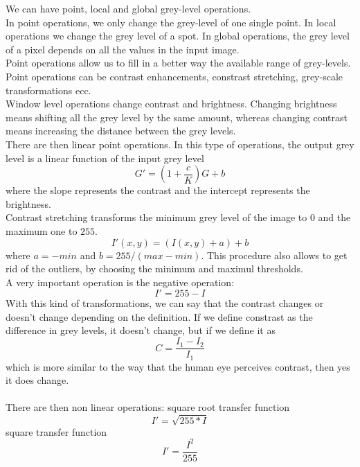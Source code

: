 We can have point, local and global grey-level operations. \\
In point operations, we only change the grey-level of one single point. In local operations we change the grey level of a spot. In global operations, the grey level of a pixel depends on all the values in the input image. \\
Point operations allow us to fill in a better way the available range of grey-levels. \\
Point operations can be contrast enhancements, constrast stretching, grey-scale transformations ecc. \\
Window level operations change contrast and brightness. Changing brightness means shifting all the grey level by the same amount, whereas changing contrast means increasing the distance between the grey levels. \\
There are then linear point operations. In this type of operations, the output grey level is a linear function of the input grey level
$$
	G' = \left(1+\frac{c}{K}\right)G + b
$$
where the slope represents the contrast and the intercept represents the brightness. \\
Contrast stretching transforms the minimum grey level of the image to $0$ and the maximum one to $255$.
$$
	I'(x,y) = (I(x,y)+a) + b
$$
where $a = -min$ and $b = 255/(max-min)$. This procedure also allows to get rid of the outliers, by choosing the minimum and maximul thresholds. \\
A very important operation is the negative operation:
$$
	I' = 255 - I
$$
With this kind of transformations, we can say that the contrast changes or doesn't change depending on the definition. If we define constrast as the difference in grey levels, it doesn't change, but if we define it as
$$
	C = \frac{I_1-I_2}{I_1}
$$
which is more similar to the way that the human eye perceives contrast, then yes it does change. \\ \\
There are then non linear operations:
square root transfer function
$$
	I' = \sqrt{255*I}
$$
square transfer function
$$
	I' = \frac{I^2}{255}
$$
